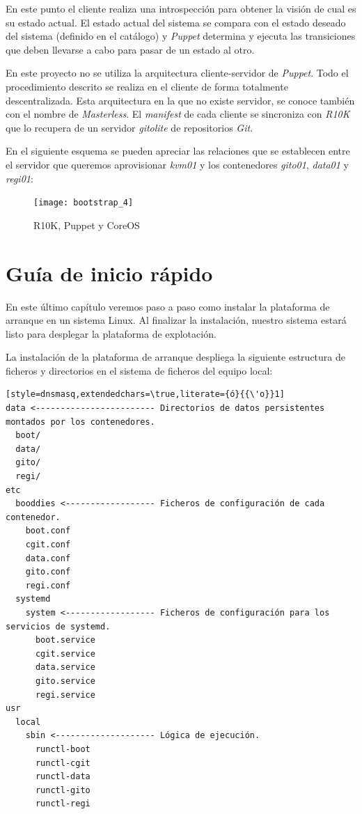 \documentclass[a4paper,12pt,spanish,final]{epsc_tfc_pfc}
\begin{document}
En este punto el cliente realiza una introspección para obtener la visión de cual es su estado actual. El estado actual del sistema se compara con el estado deseado del sistema (definido en el catálogo) y \emph{Puppet} determina y ejecuta las transiciones que deben llevarse a cabo para pasar de un estado al otro.

En este proyecto no se utiliza la arquitectura cliente-servidor de \emph{Puppet}. Todo el procedimiento descrito se realiza en el cliente de forma totalmente descentralizada. Esta arquitectura en la que no existe servidor, se conoce también con el nombre de \emph{Masterless}. El \emph{manifest} de cada cliente se sincroniza con \emph{R10K} que lo recupera de un servidor \emph{gitolite} de repositorios \emph{Git}.

En el siguiente esquema se pueden apreciar las relaciones que se establecen entre el servidor que queremos aprovisionar \emph{kvm01} y los contenedores \emph{gito01}, \emph{data01} y \emph{regi01}:\\

\begin{figure}[h]
  \centering
    \texttt{[image: bootstrap\_4]}
      \caption{R10K, Puppet y CoreOS}
\end{figure}


\chapter{Guía de inicio rápido}

En este último capítulo veremos paso a paso como instalar la plataforma de arranque en un sistema Linux. Al finalizar la instalación, nuestro sistema estará listo para desplegar la plataforma de explotación.

La instalación de la plataforma de arranque despliega la siguiente estructura de ficheros y directorios en el sistema de ficheros del equipo local:\\

\begin{lstlisting}[style=dnsmasq,extendedchars=\true,literate={ó}{{\'o}}1]
data <------------------------ Directorios de datos persistentes montados por los contenedores.
  boot/
  data/
  gito/
  regi/
etc
  booddies <------------------ Ficheros de configuración de cada contenedor.
    boot.conf
    cgit.conf
    data.conf
    gito.conf
    regi.conf
  systemd
    system <------------------ Ficheros de configuración para los servicios de systemd.
      boot.service
      cgit.service
      data.service
      gito.service
      regi.service
usr
  local
    sbin <-------------------- Lógica de ejecución.
      runctl-boot
      runctl-cgit
      runctl-data
      runctl-gito
      runctl-regi
\end{lstlisting}
\end{document}
